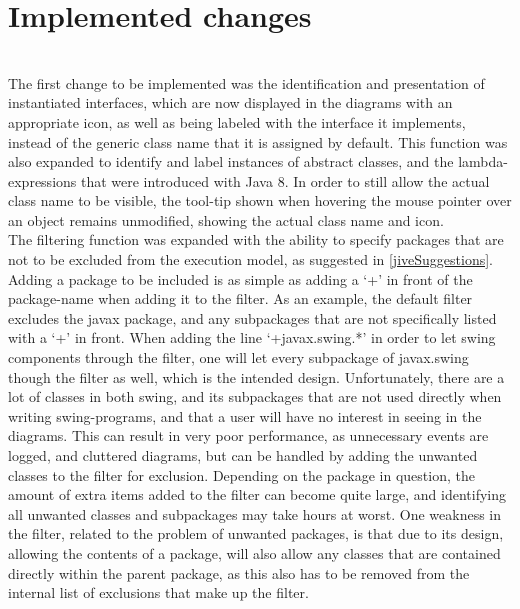 \section{Implemented changes}\label{jiveImpl}%
~\\

The first change to be implemented was the identification and presentation of instantiated interfaces, which are now displayed in the diagrams with an appropriate icon, as well as being labeled with the interface it implements, instead of the generic class name that it is assigned by default.
This function was also expanded to identify and label instances of abstract classes, and the lambda-expressions that were introduced with Java 8.%
In order to still allow the actual class name to be visible, the tool-tip shown when hovering the mouse pointer over an object remains unmodified, showing the actual class name and icon.
~\\

The filtering function was expanded with the ability to specify packages that are not to be excluded from the execution model, as suggested in \autoref{jiveSuggestions}.
Adding a package to be included is as simple as adding a `+' in front of the package-name when adding it to the filter.
As an example, the default filter excludes the javax package, and any subpackages that are not specifically listed with a `+' in front.
When adding the line `+javax.swing.*' in order to let swing components through the filter, one will let every subpackage of javax.swing though the filter as well, which is the intended design.
Unfortunately, there are a lot of classes in both swing, and its subpackages that are not used directly when writing swing-programs, and that a user will have no interest in seeing in the diagrams.
This can result in very poor performance, as unnecessary events are logged, and cluttered diagrams, but can be handled by adding the unwanted classes to the filter for exclusion.
Depending on the package in question, the amount of extra items added to the filter can become quite large, and identifying all unwanted classes and subpackages may take hours at worst.
One weakness in the filter, related to the problem of unwanted packages, is that due to its design, allowing the contents of a package, will also allow any classes that are contained directly within the parent package, as this also has to be removed from the internal list of exclusions that make up the filter.
~\\

